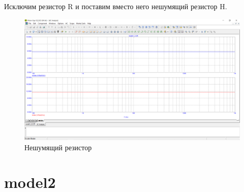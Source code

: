 \documentclass[a4paper, 12pt]{article}%
\begin{document}


\subsubsection{} 

Исключим резистор R и поставим вместо него нешумящий резистор H. 

\begin{figure}[h!]
    \centering
    \includegraphics[scale = 0.4 \textwidth]{images/mod1_3_2.png}
    \caption{Нешумящий резистор}
\end{figure}

\section{\textbf{model2}}

\subsection{}
\end{document}
